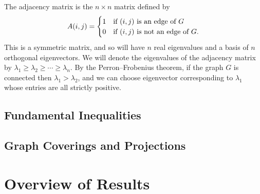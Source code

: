 The adjacency matrix is the $n \times n$ matrix defined by
\[
 A(i,j) =
  \begin{cases} 
      \hfill 1 \hfill & \text{if $(i,j)$ is an edge of $G$} \\
      \hfill 0 \hfill & \text{if $(i,j)$ is not an edge of $G$.} \\
  \end{cases}
\]
This is a symmetric matrix, and so will have $n$ real eigenvalues and a basis of
$n$ orthogonal eigenvectors.  We will denote the eigenvalues of the adjacency matrix
by $\lambda_1 \geq \lambda_2 \geq \cdots \geq \lambda_n$.  By the Perron--Frobenius theorem,
if the graph $G$ is connected then $\lambda_1 > \lambda_2$, and we can choose
eigenvector corresponding to $\lambda_1$ whose entries are all strictly positive.






\subsection{Fundamental Inequalities}

\subsection{Graph Coverings and Projections}

\section{Overview of Results}



